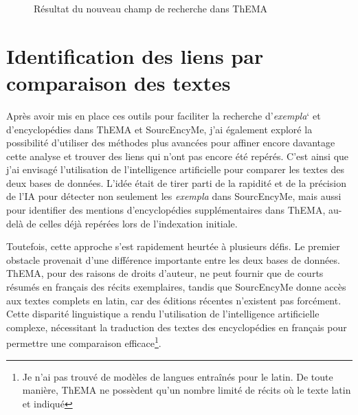\begin{figure}[H]
	\centering
	\caption{Résultat du nouveau champ de recherche dans ThEMA}
\end{figure}

\section{Identification des liens par comparaison des textes}
Après avoir mis en place ces outils pour faciliter la recherche d'\textit{exempla}` et d'encyclopédies dans ThEMA et SourcEncyMe, j'ai également exploré la possibilité d'utiliser des méthodes plus avancées pour affiner encore davantage cette analyse et trouver des liens qui n'ont pas encore été repérés. C'est ainsi que j'ai envisagé l'utilisation de l'intelligence artificielle pour comparer les textes des deux bases de données. L'idée était de tirer parti de la rapidité et de la précision de l'IA pour détecter non seulement les \textit{exempla} dans SourcEncyMe, mais aussi pour identifier des mentions d'encyclopédies supplémentaires dans ThEMA, au-delà de celles déjà repérées lors de l'indexation initiale.

Toutefois, cette approche s'est rapidement heurtée à plusieurs défis. Le premier obstacle provenait d'une différence importante entre les deux bases de données. ThEMA, pour des raisons de droits d'auteur, ne peut fournir que de courts résumés en français des récits exemplaires, tandis que SourcEncyMe donne accès aux textes complets en latin, car des éditions récentes n'existent pas forcément. Cette disparité linguistique a rendu l'utilisation de l'intelligence artificielle complexe, nécessitant la traduction des textes des encyclopédies en français pour permettre une comparaison efficace\footnote{Je n'ai pas trouvé de modèles de langues entraînés pour le latin. De toute manière, ThEMA ne possèdent qu'un nombre limité de récits où le texte latin et indiqué}.\\

